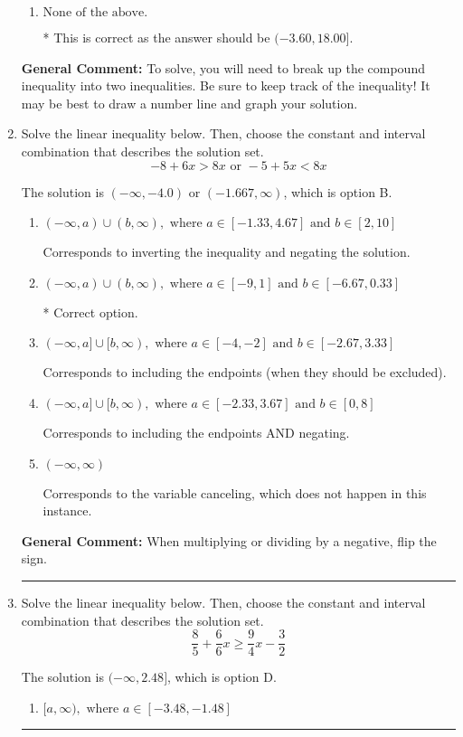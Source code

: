 \documentclass{extbook}[14pt]
\newcommand{\litem}[1]{\item #1

\rule{\textwidth}{0.4pt}}
\begin{document}
\begin{enumerate}
{\begin{enumerate}[label=\Alph*.]
$[3.60, -18.00)$, which corresponds to flipping the inequality and getting negatives of the actual endpoints.
\item \( \text{None of the above.} \)

* This is correct as the answer should be $(-3.60, 18.00]$.
\end{enumerate}

\textbf{General Comment:} To solve, you will need to break up the compound inequality into two inequalities. Be sure to keep track of the inequality! It may be best to draw a number line and graph your solution.
}
\litem{
Solve the linear inequality below. Then, choose the constant and interval combination that describes the solution set.
\[ -8 + 6 x > 8 x \text{ or } -5 + 5 x < 8 x \]

The solution is \( (-\infty, -4.0) \text{ or } (-1.667, \infty) \), which is option B.\begin{enumerate}[label=\Alph*.]
\item \( (-\infty, a) \cup (b, \infty), \text{ where } a \in [-1.33, 4.67] \text{ and } b \in [2, 10] \)

Corresponds to inverting the inequality and negating the solution.
\item \( (-\infty, a) \cup (b, \infty), \text{ where } a \in [-9, 1] \text{ and } b \in [-6.67, 0.33] \)

 * Correct option.
\item \( (-\infty, a] \cup [b, \infty), \text{ where } a \in [-4, -2] \text{ and } b \in [-2.67, 3.33] \)

Corresponds to including the endpoints (when they should be excluded).
\item \( (-\infty, a] \cup [b, \infty), \text{ where } a \in [-2.33, 3.67] \text{ and } b \in [0, 8] \)

Corresponds to including the endpoints AND negating.
\item \( (-\infty, \infty) \)

Corresponds to the variable canceling, which does not happen in this instance.
\end{enumerate}

\textbf{General Comment:} When multiplying or dividing by a negative, flip the sign.
}
\litem{
Solve the linear inequality below. Then, choose the constant and interval combination that describes the solution set.
\[ \frac{8}{5} + \frac{6}{6} x \geq \frac{9}{4} x - \frac{3}{2} \]

The solution is \( (-\infty, 2.48] \), which is option D.\begin{enumerate}[label=\Alph*.]
\item \( [a, \infty), \text{ where } a \in [-3.48, -1.48] \)


\end{enumerate}}
\end{enumerate}
\end{document}
